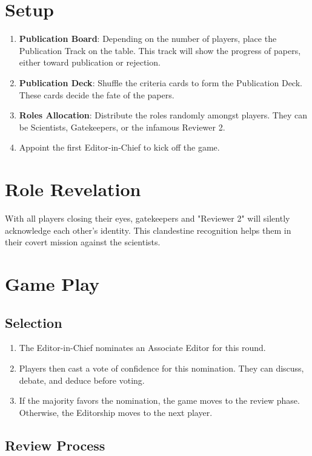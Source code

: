 \documentclass[sigplan,screen,nonacm]{acmart}
\begin{document}
\section{Setup}

\begin{enumerate}
	\item \textbf{Publication Board}: Depending on the number of players, place the Publication Track on the table. This track will show the progress of papers, either toward publication or rejection.
	\item \textbf{Publication Deck}: Shuffle the criteria cards to form the Publication Deck. These cards decide the fate of the papers.
	\item \textbf{Roles Allocation}: Distribute the roles randomly amongst players. They can be Scientists, Gatekeepers, or the infamous Reviewer 2.
	\item Appoint the first Editor-in-Chief to kick off the game.
\end{enumerate}

\section{Role Revelation}

With all players closing their eyes, gatekeepers and "Reviewer 2" will silently acknowledge each other's identity. This clandestine recognition helps them in their covert mission against the scientists.

\section{Game Play}

\subsection{Selection}

\begin{enumerate}
	\item The Editor-in-Chief nominates an Associate Editor for this round.
	\item Players then cast a vote of confidence for this nomination. They can discuss, debate, and deduce before voting.
	\item If the majority favors the nomination, the game moves to the review phase. Otherwise, the Editorship moves to the next player.
\end{enumerate}

\subsection{Review Process}
\end{document}
